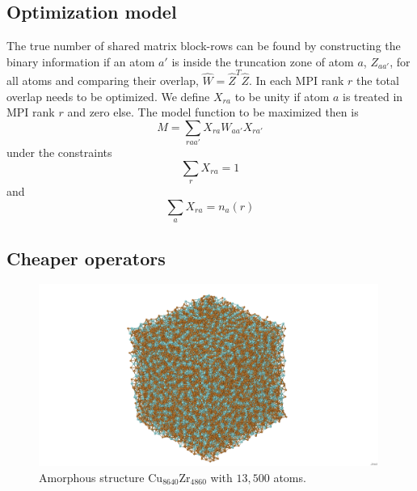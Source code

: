 \documentclass[a4paper]{article}
\newcommand{\MPIrank}{MPI rank} %
\begin{document}
\subsection{Optimization model} \label{sec:optimization_model}

The true number of shared matrix block-rows can be found by constructing the binary information
if an atom $a'$ is inside the truncation zone of atom $a$, $Z_{aa'}$, 
for all atoms and comparing their overlap, $\hat W = \hat Z^T \hat Z$.
In each \MPIrank{} $r$ the total overlap needs to be optimized.
We define $X_{ra}$ to be unity if atom $a$ is treated in \MPIrank{} $r$ and zero else.
The model function to be maximized then is
\begin{equation}
 M = \sum_{raa'} X_{ra} W_{aa'} X_{ra'} \label{eqn:quadratic_term}
\end{equation}
under the constraints
\begin{equation}
 \sum_{r} X_{ra} = 1  \label{eqn:constraint_atom}
\end{equation}
and
\begin{equation}
 \sum_{a} X_{ra} = n_{a}(r)  \label{eqn:constraint_rank}
\end{equation}

\subsection{Cheaper operators} \label{sec:cheaper_operators}

\begin{figure}[h!]
\begin{center}
  \includegraphics[width=0.99\textwidth]{Cu8640Zr4860}
  \caption{Amorphous structure $\mathrm{Cu}_{8640}\mathrm{Zr}_{4860}$ with $13,500$ atoms.}
\end{center}
\label{fig:Cu8640Zr4860_jmol}
\end{figure}
\end{document}

